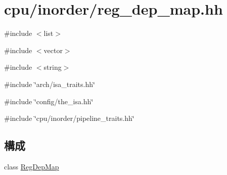 \hypertarget{reg__dep__map_8hh}{
\section{cpu/inorder/reg\_\-dep\_\-map.hh}
\label{reg__dep__map_8hh}
}
{\ttfamily \#include $<$list$>$}\par
{\ttfamily \#include $<$vector$>$}\par
{\ttfamily \#include $<$string$>$}\par
{\ttfamily \#include \char`\"{}arch/isa\_\-traits.hh\char`\"{}}\par
{\ttfamily \#include \char`\"{}config/the\_\-isa.hh\char`\"{}}\par
{\ttfamily \#include \char`\"{}cpu/inorder/pipeline\_\-traits.hh\char`\"{}}\par
\subsection*{構成}
\begin{DoxyCompactItemize}
\item 
class \hyperlink{classRegDepMap}{RegDepMap}
\end{DoxyCompactItemize}
